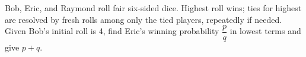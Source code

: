 Bob, Eric, and Raymond roll fair six-sided dice. Highest roll wins; ties for highest are resolved by fresh rolls among only the tied players, repeatedly if needed. Given Bob's initial roll is 4, find Eric's winning probability $\dfrac{p}{q}$ in lowest terms and give $p+q$.
